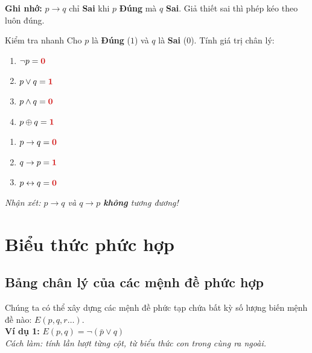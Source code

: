 \documentclass[12pt,a4paper]{article}
\begin{document}
\textbf{\textcolor{AccentRed}{Ghi nhớ:}} $p \to q$ chỉ \textbf{Sai} khi $p$ \textbf{Đúng} mà $q$ \textbf{Sai}. Giả thiết sai thì phép kéo theo luôn đúng.

\begin{baitap}{Kiểm tra nhanh}
Cho $p$ là \textbf{Đúng} ($1$) và $q$ là \textbf{Sai} ($0$). Tính giá trị chân lý:

\noindent
\begin{minipage}[t]{0.45\textwidth}
\begin{enumerate}
  \item $\neg p = \textcolor{AccentRed}{\mathbf{0}}$
  \item $p \lor q = \textcolor{AccentRed}{\mathbf{1}}$
  \item $p \land q = \textcolor{AccentRed}{\mathbf{0}}$
  \item $p \oplus q = \textcolor{AccentRed}{\mathbf{1}}$
\end{enumerate}
\end{minipage}
\hfill
\begin{minipage}[t]{0.45\textwidth}
\begin{enumerate}[start=5]
  \item $p \to q = \textcolor{AccentRed}{\mathbf{0}}$
  \item $q \to p = \textcolor{AccentRed}{\mathbf{1}}$
  \item $p \leftrightarrow q = \textcolor{AccentRed}{\mathbf{0}}$
\end{enumerate}
\end{minipage}

\vspace{4pt}
\centering
\textit{Nhận xét: $p \to q$ và $q \to p$ \textbf{không} tương đương!}
\end{baitap}

\section{Biểu thức phức hợp}

\subsection{Bảng chân lý của các mệnh đề phức hợp}

Chúng ta có thể xây dựng các mệnh đề phức tạp chứa bất kỳ số lượng biến mệnh đề nào: $E(p, q, r\dots)$.\\
\textbf{Ví dụ 1:} $E(p, q) = \neg(\bar{p} \lor q)$\\
\textit{Cách làm: tính lần lượt từng cột, từ biểu thức con trong cùng ra ngoài.}
\end{document}
